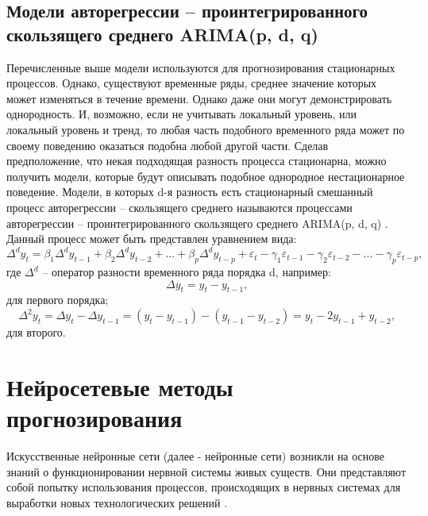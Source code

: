 \documentclass[a4paper,14pt,russian]{extreport}
\begin{document}
 \subsection{Модели авторегрессии -- проинтегрированного скользящего среднего 
 ARIMA(p, d, q)}
 Перечисленные выше модели используются для прогнозирования стационарных 
 процессов. Однако, существуют временные ряды, среднее значение которых 
 может изменяться в течение времени. Однако даже они могут демонстрировать 
 однородность. И, возможно, если не учитывать локальный уровень, или 
 локальный уровень и тренд, то любая часть подобного временного ряда может 
 по своему поведению оказаться подобна любой другой части. Сделав 
 предположение, что некая подходящая разность процесса стационарна, можно 
 получить модели, которые будут описывать подобное однородное 
 нестационарное поведение. Модели, в которых d-я разность есть стационарный 
 смешанный процесс авторегрессии -- скользящего среднего называются 
 процессами авторегрессии -- проинтегрированного скользящего среднего 
 ARIMA(p, d, q) \cite{box2008}. Данный процесс может быть представлен 
 уравнением вида:
 \begin{equation}
	\Delta^d y_t = \beta_1 \Delta^d y_{t-1} + \beta_2 \Delta^d y_{t-2} + ... 
		+ \beta_p \Delta^d y_{t-p} + \varepsilon_t  - \gamma_1 \varepsilon_{t-1} 
		- \gamma_2 \varepsilon_{t-2} - ... - \gamma_p \varepsilon_{t-p}, 
\end{equation}
где $\Delta^d$ --  оператор разности временного ряда порядка d, например: 
\begin{equation}
	\Delta y_t = y_t - y_{t - 1} \text{,} \nonumber
\end{equation}
для первого порядка;
\begin{equation}
	\Delta^2 y_t = \Delta y_t - \Delta y_{t - 1} = (y_t - y_{t - 1}) - (y_{t - 1} - y_{t - 2}) 
		= y_t - 2y_{t - 1} + y_{t - 2} \text{,} \nonumber
\end{equation}
для второго.

\section{Нейросетевые методы прогнозирования}
Искусственные нейронные сети (далее - нейронные сети) возникли на основе 
знаний о функционировании нервной системы живых существ. Они 
представляют собой попытку использования процессов, происходящих в 
нервных системах для выработки новых технологических решений 
\cite{osovskiy2002}. 
\end{document}
